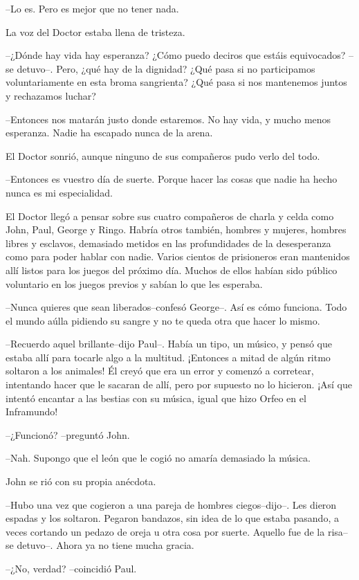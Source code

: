 --Lo es. Pero es mejor que no tener nada.

La voz del Doctor estaba llena de tristeza.

--¿Dónde hay vida hay esperanza? ¿Cómo puedo deciros que estáis
equivocados? --se detuvo--. Pero, ¿qué hay de la dignidad? ¿Qué pasa si
no participamos voluntariamente en esta broma sangrienta? ¿Qué pasa si
nos mantenemos juntos y rechazamos luchar?

--Entonces nos matarán justo donde estaremos. No hay vida, y mucho menos
esperanza. Nadie ha escapado nunca de la arena.

El Doctor sonrió, aunque ninguno de sus compañeros pudo verlo del todo.

--Entonces es vuestro día de suerte. Porque hacer las cosas que nadie ha
hecho nunca es mi especialidad.

El Doctor llegó a pensar sobre sus cuatro compañeros de charla y celda
como John, Paul, George y Ringo. Habría otros también, hombres y
mujeres, hombres libres y esclavos, demasiado metidos en las
profundidades de la desesperanza como para poder hablar con nadie.
Varios cientos de prisioneros eran mantenidos allí listos para los
juegos del próximo día. Muchos de ellos habían sido público voluntario
en los juegos previos y sabían lo que les esperaba.

--Nunca quieres que sean liberados--confesó George--. Así es cómo
funciona. Todo el mundo aúlla pidiendo su sangre y no te queda otra que
hacer lo mismo.

--Recuerdo aquel brillante--dijo Paul--. Había un tipo, un músico, y
pensó que estaba allí para tocarle algo a la multitud. ¡Entonces a mitad
de algún ritmo soltaron a los animales! Él creyó que era un error y
comenzó a corretear, intentando hacer que le sacaran de allí, pero por
supuesto no lo hicieron. ¡Así que intentó encantar a las bestias con su
música, igual que hizo Orfeo en el Inframundo!

--¿Funcionó? --preguntó John.

--Nah. Supongo que el león que le cogió no amaría demasiado la música.

John se rió con su propia anécdota.

--Hubo una vez que cogieron a una pareja de hombres ciegos--dijo--. Les
dieron espadas y los soltaron. Pegaron bandazos, sin idea de lo que
estaba pasando, a veces cortando un pedazo de oreja u otra cosa por
suerte. Aquello fue de la risa--se detuvo--. Ahora ya no tiene mucha
gracia.

--¿No, verdad? --coincidió Paul.

